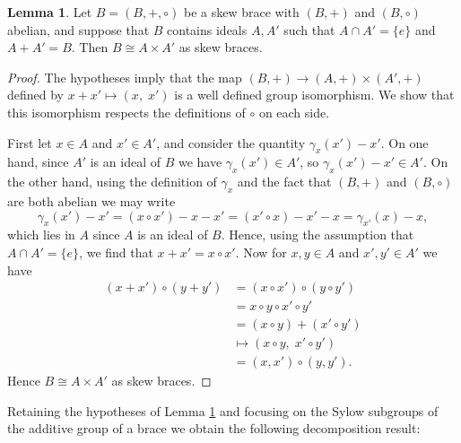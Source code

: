 \documentclass[reqno]{amsart}
\theoremstyle{definition}
\newtheorem{lemma}[theorem]{Lemma}
\begin{document}
\begin{lemma} \label{lemma_internal_direct_product}
Let $ B = (B,+,\circ) $ be a skew brace with $ (B,+) $ and $ (B,\circ) $ abelian, and suppose that $ B $ contains ideals $ A, A' $ such that $ A \cap A' = \{ e \} $ and $ A + A' = B $. Then $ B \cong A \times A' $ as skew  braces. 
\end{lemma}
\begin{proof}
The hypotheses imply that the map $ (B,+) \rightarrow (A,+) \times (A',+) $ defined by $ x+x' \mapsto (x, \; x') $ is a well defined group isomorphism. We show that this isomorphism respects the definitions of $ \circ $ on each side. 

First let $ x \in A $ and $ x' \in A' $, and consider the quantity $ \gamma_{x}(x')-x' $. On one hand, since $ A' $ is an ideal of $ B $ we have $ \gamma_{x}(x') \in A' $, so $ \gamma_{x}(x')-x' \in A' $. On the other hand, using the definition of $ \gamma_{x} $ and the fact that $ (B,+) $ and $ (B,\circ) $ are both abelian we may write
\[ \gamma_{x}(x')-x' = (x \circ x')-x-x' = (x' \circ x)-x'-x = \gamma_{x'}(x)-x, \]
which lies in $ A $ since $ A $ is an ideal of $ B $. Hence, using the assumption that $ A \cap A' = \{ e \} $, we find that $ x + x' =  x \circ x' $. Now for $ x,y \in A $ and $ x',y' \in A' $ we have
\begin{align*}
(x+x') \circ (y+y') & = (x \circ x') \circ (y \circ y') \\
& = x \circ y \circ x' \circ y' \\
& = (x \circ y) + (x' \circ y') \\
& \mapsto (x \circ y, \; x' \circ y') \\
& = (x,x') \circ (y,y').
\end{align*}
Hence $ B \cong A \times A' $ as skew  braces.
\end{proof}

Retaining the hypotheses of Lemma \ref{lemma_internal_direct_product} and focusing on the Sylow subgroups of the additive group of a brace we obtain the following decomposition result:
\end{document}
